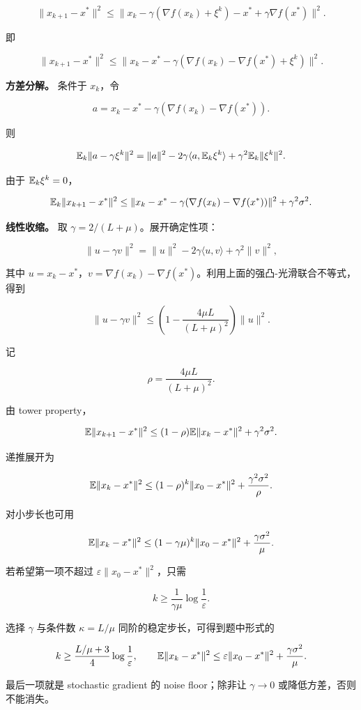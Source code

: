 \[
  \|x_{k+1}-x^*\|^2
  \le
  \|x_k-\gamma(\nabla f(x_k)+\xi^k)-x^*+\gamma\nabla f(x^*)\|^2.
\]

即

\[
  \|x_{k+1}-x^*\|^2
  \le
  \|x_k-x^*-\gamma(\nabla f(x_k)-\nabla f(x^*)+\xi^k)\|^2.
\]

\textbf{方差分解。} 条件于 \(x_k\)，令

\[
  a=x_k-x^*-\gamma(\nabla f(x_k)-\nabla f(x^*)).
\]

则

\[
  \mathbb{E}_k\|a-\gamma\xi^k\|^2
  =
  \|a\|^2
  -2\gamma\langle a,\mathbb{E}_k\xi^k\rangle
  +
  \gamma^2\mathbb{E}_k\|\xi^k\|^2.
\]

由于 \(\mathbb{E}_k\xi^k=0\)，

\[
  \mathbb{E}_k\|x_{k+1}-x^*\|^2
  \le
  \|x_k-x^*-\gamma(\nabla f(x_k)-\nabla f(x^*))\|^2
  +
  \gamma^2\sigma^2.
\]

\textbf{线性收缩。} 取 \(\gamma=2/(L+\mu)\)。展开确定性项：

\[
  \|u-\gamma v\|^2
  =
  \|u\|^2-2\gamma\langle u,v\rangle+\gamma^2\|v\|^2,
\]

其中 \(u=x_k-x^*\)，\(v=\nabla f(x_k)-\nabla f(x^*)\)。利用上面的强凸-光滑联合不等式，得到

\[
  \|u-\gamma v\|^2
  \le
  \left(1-\frac{4\mu L}{(L+\mu)^2}\right)\|u\|^2.
\]

记

\[
  \rho=\frac{4\mu L}{(L+\mu)^2}.
\]

由 tower property，

\[
  \mathbb{E}\|x_{k+1}-x^*\|^2
  \le
  (1-\rho)\mathbb{E}\|x_k-x^*\|^2+\gamma^2\sigma^2.
\]

递推展开为

\[
  \mathbb{E}\|x_k-x^*\|^2
  \le
  (1-\rho)^k\|x_0-x^*\|^2
  +
  \frac{\gamma^2\sigma^2}{\rho}.
\]

对小步长也可用

\[
  \mathbb{E}\|x_k-x^*\|^2
  \le
  (1-\gamma\mu)^k\|x_0-x^*\|^2+\frac{\gamma\sigma^2}{\mu}.
\]

若希望第一项不超过 \(\varepsilon\|x_0-x^*\|^2\)，只需

\[
  k\ge \frac{1}{\gamma\mu}\log\frac1\varepsilon.
\]

选择 \(\gamma\) 与条件数 \(\kappa=L/\mu\) 同阶的稳定步长，可得到题中形式的

\[
  k\ge \frac{L/\mu+3}{4}\log\frac1\varepsilon,
  \qquad
  \mathbb{E}\|x_k-x^*\|^2
  \le
  \varepsilon\|x_0-x^*\|^2+\frac{\gamma\sigma^2}{\mu}.
\]

最后一项就是 stochastic gradient 的 noise floor；除非让 \(\gamma\to0\) 或降低方差，否则不能消失。

